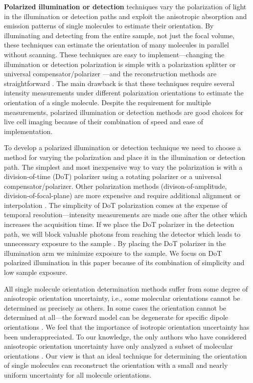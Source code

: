 \documentclass[10pt]{article}
\begin{document}
\textbf{Polarized illumination or detection} techniques vary the polarization of
light in the illumination or detection paths and exploit the anisotropic
absorption and emission patterns of single molecules to estimate their
orientation. By illuminating and detecting from the entire sample, not just the
focal volume, these techniques can estimate the orientation of many molecules in
parallel without scanning. These techniques are easy to implement---changing the
illumination or detection polarization is simple with a polarization splitter
\cite{mehta2016} or universal compensator/polarizer \cite{shribak2003}---and the
reconstruction methods are straightforward \cite{fourkas2001, mehta2016,
  backer2016}. The main drawback is that these techniques require several
intensity measurements under different polarization orientations to estimate the
orientation of a single molecule. Despite the requirement for multiple
measurements, polarized illumination or detection methods are good choices for
live cell imaging because of their combination of speed and ease of
implementation.

To develop a polarized illumination or detection technique we need to choose a
method for varying the polarization and place it in the illumination or
detection path. The simplest and most inexpensive way to vary the polarization
is with a division-of-time (DoT) polarizer using a rotating polarizer or a
universal compensator/polarizer. Other polarization methods
(divison-of-amplitude, division-of-focal-plane) are more expensive and require
additional alignment or interpolation \cite{tyo2006}. The simplicity of DoT
polarization comes at the expense of temporal resolution---intensity
measurements are made one after the other which increases the acquisition
time. If we place the DoT polarizer in the detection path, we will block
valuable photons from reaching the detector which leads to unnecessary exposure
to the sample \cite{demay2011}. By placing the DoT polarizer in the illumination
arm we minimize exposure to the sample. We focus on DoT polarized illumination
in this paper because of its combination of simplicity and low sample exposure.

All single molecule orientation determination methods suffer from some degree of
anisotropic orientation uncertainty, i.e., some molecular orientations cannot be
determined as precisely as others. In some cases the orientation cannot be
determined at all---the forward model can be degenerate for specific dipole
orientations \cite{fourkas2001, lu2008}. We feel that the importance of
isotropic orientation uncertainty has been underappreciated. To our knowledge,
the only authors who have considered anisotropic orientation uncertainty have
only analyzed a subset of molecular orientations \cite{agrawal2012}. Our view is
that an ideal technique for determining the orientation of single molecules can
reconstruct the orientation with a small and nearly uniform uncertainty for all
molecule orientations.
\end{document}

